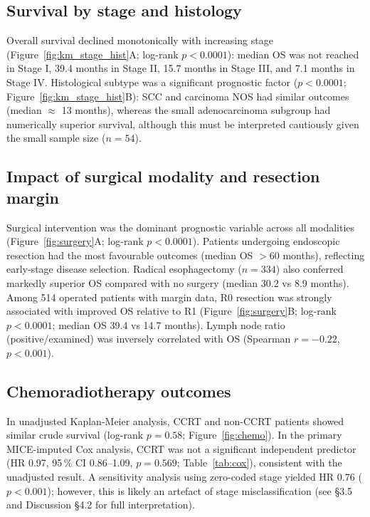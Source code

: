 \documentclass[12pt,a4paper]{article}
\begin{document}
\subsection{Survival by stage and histology}
Overall survival declined monotonically with increasing stage
(Figure~\ref{fig:km_stage_hist}A; log-rank $p < 0.0001$): median OS was
not reached in Stage I, 39.4 months in Stage II, 15.7 months in Stage III,
and 7.1 months in Stage IV. Histological subtype was a significant
prognostic factor ($p < 0.0001$; Figure~\ref{fig:km_stage_hist}B):
SCC and carcinoma NOS had similar outcomes (median $\approx$ 13 months),
whereas the small adenocarcinoma subgroup had numerically superior
survival, although this must be interpreted cautiously given the small
sample size ($n = 54$).

\subsection{Impact of surgical modality and resection margin}
Surgical intervention was the dominant prognostic variable across all
modalities (Figure~\ref{fig:surgery}A; log-rank $p < 0.0001$). Patients
undergoing endoscopic resection had the most favourable outcomes (median OS
$> 60$ months), reflecting early-stage disease selection. Radical
esophagectomy ($n = 334$) also conferred markedly superior OS compared
with no surgery (median 30.2 vs 8.9 months). Among 514 operated patients
with margin data, R0 resection was strongly associated with improved OS
relative to R1 (Figure~\ref{fig:surgery}B; log-rank $p < 0.0001$; median
OS 39.4 vs 14.7 months). Lymph node ratio (positive/examined) was
inversely correlated with OS (Spearman $r = -0.22$, $p < 0.001$).

\subsection{Chemoradiotherapy outcomes}
In unadjusted Kaplan-Meier analysis, CCRT and non-CCRT patients showed
similar crude survival (log-rank $p = 0.58$; Figure~\ref{fig:chemo}).
In the primary MICE-imputed Cox analysis, CCRT was not a significant
independent predictor (HR 0.97, 95\,\% CI 0.86--1.09, $p = 0.569$;
Table~\ref{tab:cox}), consistent with the unadjusted result. A
sensitivity analysis using zero-coded stage yielded HR 0.76
($p < 0.001$); however, this is likely an artefact of stage
misclassification (see §3.5 and Discussion §4.2 for full interpretation).
\end{document}
